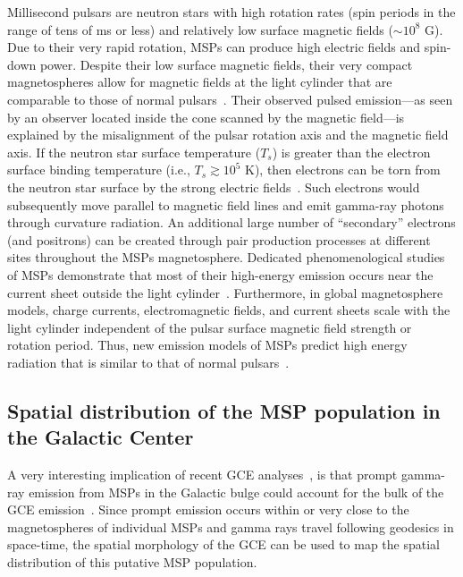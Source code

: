 \documentclass[doublespace,nopageskip]{VTthesis}
\begin{document}
Millisecond pulsars are neutron stars with high rotation rates (spin periods in the range of tens of ms or less) and relatively low surface magnetic fields ($\sim 10^{8}$ G). Due to their very rapid rotation, MSPs can produce high  
electric fields and spin-down power. Despite their low surface magnetic fields, their very compact magnetospheres allow for 
magnetic fields at the light cylinder that are comparable to those of normal pulsars~\citep{2021arXiv210105751H}. Their observed pulsed emission---as seen by an observer located inside the cone scanned by the magnetic field---is explained by the misalignment of the pulsar rotation axis and the magnetic field axis.  If the neutron star surface temperature ($T_s$) is greater than the electron surface binding temperature (i.e., $T_s\gtrsim 10^5$ K), then electrons can be torn from the neutron star surface by the strong electric fields~\citep{1991tnsm.book.....M}. Such electrons would subsequently move parallel to magnetic field lines and emit gamma-ray photons through curvature radiation. An additional large number of ``secondary'' electrons (and positrons) can be created through pair production processes at different sites throughout the MSPs magnetosphere. 
Dedicated phenomenological studies of MSPs demonstrate that most of their high-energy emission occurs near the current sheet outside the light cylinder~\citep{2020ApJS..247...33A,2021arXiv210105751H}.
Furthermore, in global magnetosphere models, charge currents, electromagnetic fields, and current sheets scale with the light cylinder independent of the pulsar surface magnetic field strength or rotation period. Thus, new emission models of MSPs predict high energy radiation that is similar to that of normal pulsars~\cite{2021arXiv210105751H}.

\subsection{Spatial distribution of the MSP population in the Galactic Center}
\label{subsec:spatialdistribution}

A very interesting implication of recent GCE analyses~\citep{2018NatAs...2..387M,2018NatAs...2..819B,2019JCAP...09..042M,2020PhRvD.102d3012A}, is that prompt gamma-ray emission from MSPs in the Galactic bulge could account for the bulk of the GCE emission~\citep{2012PhRvD..86h3511A}. Since 
prompt emission occurs within or very close to the magnetospheres of individual MSPs and
gamma rays travel following geodesics in space-time, the spatial morphology of the GCE can be used to map the spatial distribution of this putative MSP population.
\end{document}

